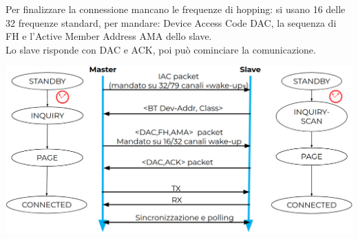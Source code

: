 \newpage

Per finalizzare la connessione mancano le frequenze di hopping: si usano 16 delle 32 frequenze standard, per mandare: Device Access Code DAC, la sequenza di FH e l'Active Member Address AMA dello slave.\\

Lo slave risponde con DAC e ACK, poi può cominciare la comunicazione.
\begin{center}
	\includegraphics[width=0.95\linewidth]{img/wpan/inquiry1}
\end{center}

